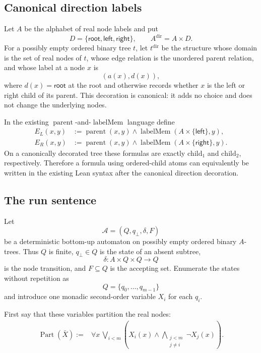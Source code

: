 \documentclass[11pt]{article}
\theoremstyle{definition}
\newcommand{\Aut}{\mathcal A}
\newcommand{\child}{\mathrm{child}}
\begin{document}
\subsection{Canonical direction labels}

Let \(A\) be the alphabet of real node labels and put
\[
  D=\{\mathsf{root},\mathsf{left},\mathsf{right}\},
  \qquad
  A^{\mathrm{dir}}=A\times D.
\]
For a possibly empty ordered binary tree \(t\), let \(t^{\mathrm{dir}}\) be the
structure whose domain is the set of real nodes of \(t\), whose edge relation
is the unordered parent relation, and whose label at a node \(x\) is
\[
  (a(x),d(x)),
\]
where \(d(x)=\mathsf{root}\) at the root and otherwise records whether \(x\)
is the left or right child of its parent.  This decoration is canonical: it
adds no choice and does not change the underlying nodes.

In the existing \(\operatorname{parent}\)-and-\(\operatorname{labelMem}\)
language define
\begin{equation}
\label{eq:ordered-child-from-direction}
\begin{aligned}
  E_L(x,y)
    &:=\operatorname{parent}(x,y)\wedge
       \operatorname{labelMem}(A\times\{\mathsf{left}\},y),\\
  E_R(x,y)
    &:=\operatorname{parent}(x,y)\wedge
       \operatorname{labelMem}(A\times\{\mathsf{right}\},y).
\end{aligned}
\end{equation}
On a canonically decorated tree these formulas are exactly \(\child_1\) and
\(\child_2\), respectively.  Therefore a formula using ordered-child atoms
can equivalently be written in the existing Lean syntax after the canonical
direction decoration.

\subsection{The run sentence}

Let
\[
  \Aut=(Q,q_\bot,\delta,F)
\]
be a deterministic bottom-up automaton on possibly empty ordered binary
\(A\)-trees.  Thus \(Q\) is finite, \(q_\bot\in Q\) is the state of an absent
subtree,
\[
  \delta:A\times Q\times Q\longrightarrow Q
\]
is the node transition, and \(F\subseteq Q\) is the accepting set.  Enumerate
the states without repetition as
\[
  Q=\{q_0,\ldots,q_{m-1}\}
\]
and introduce one monadic second-order variable \(X_i\) for each \(q_i\).

First say that these variables partition the real nodes:
\begin{equation}
\label{eq:run-state-partition}
\begin{split}
  \operatorname{Part}(\bar X):={}&
  \forall x\,
    \bigvee_{i<m}
      \left(
        X_i(x)\wedge
        \bigwedge_{\substack{j<m\\j\ne i}}\neg X_j(x)
      \right).
\end{split}
\end{equation}
\end{document}
